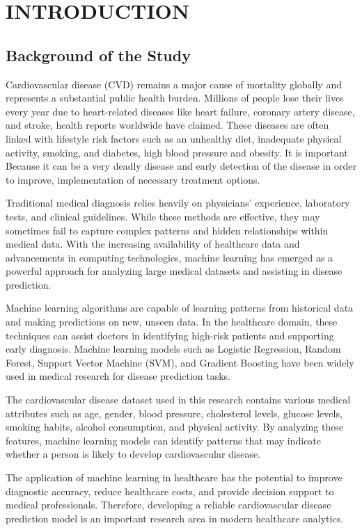 \chapter{INTRODUCTION}

\section{Background of the Study}

Cardiovascular disease (CVD) remains a major cause of mortality globally and represents a substantial public health burden. Millions of people lose their lives every year due to heart-related diseases like heart failure, coronary artery disease, and stroke, health reports worldwide have claimed. These diseases are often linked with lifestyle risk factors such as an unhealthy diet, inadequate physical activity, smoking, and diabetes, high blood pressure and obesity. It is important Because it can be a very deadly disease and early detection of the disease in order to improve, implementation of necessary treatment options.

Traditional medical diagnosis relies heavily on physicians’ experience, laboratory tests, and clinical guidelines. While these methods are effective, they may sometimes fail to capture complex patterns and hidden relationships within medical data. With the increasing availability of healthcare data and advancements in computing technologies, machine learning has emerged as a powerful approach for analyzing large medical datasets and assisting in disease prediction.

Machine learning algorithms are capable of learning patterns from historical data and making predictions on new, unseen data. In the healthcare domain, these techniques can assist doctors in identifying high-risk patients and supporting early diagnosis. Machine learning models such as Logistic Regression, Random Forest, Support Vector Machine (SVM), and Gradient Boosting have been widely used in medical research for disease prediction tasks.

The cardiovascular disease dataset used in this research contains various medical attributes such as age, gender, blood pressure, cholesterol levels, glucose levels, smoking habits, alcohol consumption, and physical activity. By analyzing these features, machine learning models can identify patterns that may indicate whether a person is likely to develop cardiovascular disease.

The application of machine learning in healthcare has the potential to improve diagnostic accuracy, reduce healthcare costs, and provide decision support to medical professionals. Therefore, developing a reliable cardiovascular disease prediction model is an important research area in modern healthcare analytics.

